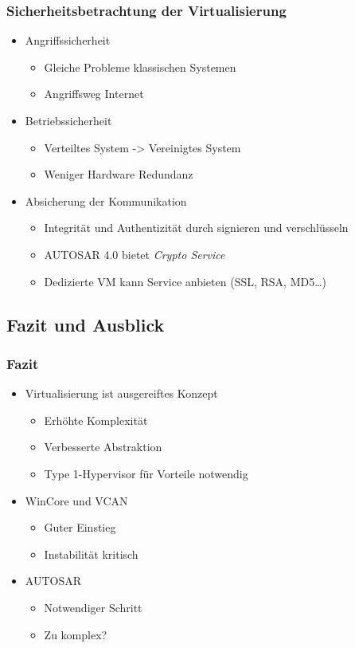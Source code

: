 \documentclass[]{beamer}
\begin{document}
\begin{frame}
\frametitle{Sicherheitsbetrachtung der Virtualisierung}
    \begin{itemize}
        \item Angriffssicherheit
        \begin{itemize}
            \item Gleiche Probleme klassischen Systemen
            \item Angriffsweg Internet
        \end{itemize}
        \pause
        \item Betriebssicherheit
        \begin{itemize}
            \item Verteiltes System -> Vereinigtes System
            \item Weniger Hardware Redundanz
        \end{itemize}
        \pause
        \item Absicherung der Kommunikation
        \begin{itemize}
            \item Integrität und Authentizität durch signieren und verschlüsseln
            \item AUTOSAR 4.0 bietet \emph{Crypto Service}
            \item Dedizierte VM kann Service anbieten (SSL, RSA, MD5\dots)
        \end{itemize}
    \end{itemize}
\end{frame}


\subsection{Fazit und Ausblick}
\begin{frame}
\frametitle{Fazit}
    \begin{itemize}
        \item Virtualisierung ist ausgereiftes Konzept
        \begin{itemize}
            \item Erhöhte Komplexität
            \item Verbesserte Abstraktion
            \item Type 1-Hypervisor für Vorteile notwendig
        \end{itemize}
        \item WinCore und VCAN
        \begin{itemize}
            \item Guter Einstieg
            \item Instabilität kritisch
        \end{itemize}
        \item AUTOSAR
        \begin{itemize}
            \item Notwendiger Schritt
            \item Zu komplex?
        \end{itemize}
    \end{itemize}
\end{frame}
\end{document}
